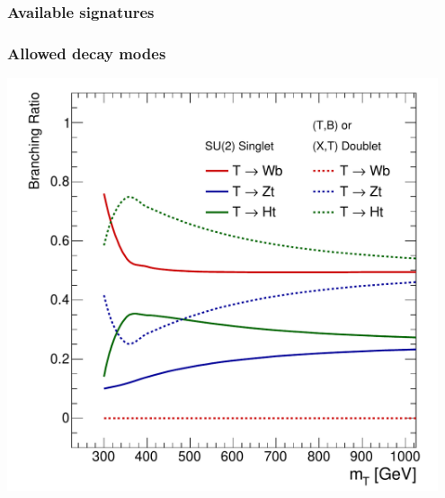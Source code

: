 \begin{frame}\frametitle{Available signatures}
\centering\myskip

\begin{minipage}{.4\textwidth}\centering
\scriptsize
\end{minipage}\begin{minipage}{.6\textwidth}\centering
\end{minipage}

\end{frame}


\begin{frame}\frametitle{Allowed decay modes}
\centering\myskip

\begin{minipage}{.4\textwidth}\centering
\scriptsize
  
\end{minipage}\begin{minipage}{.6\textwidth}\centering
  \includegraphics[width=0.95\textwidth]{../vlq_analysis/figures/fig_02a.pdf}
\end{minipage}

\end{frame}







